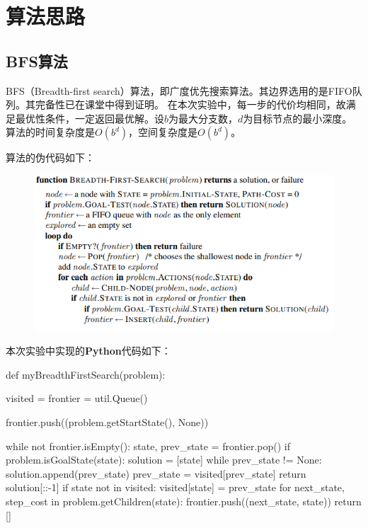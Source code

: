 \documentclass{ctexart}
\begin{document}
\section{\hei 算法思路}
\subsection{\hei BFS算法}
BFS（Breadth-first search）算法，即广度优先搜索算法。其边界选用的是FIFO队列。其完备性已在课堂中得到证明。
在本次实验中，每一步的代价均相同，故满足最优性条件，一定返回最优解。设$b$为最大分支数，$d$为目标节点的最小深度。
算法的时间复杂度是$O\left(b^{d}\right)$，空间复杂度是$O\left(b^{d}\right)$。
\par 算法的伪代码如下：
\begin{figure}[htbp]	
	\centering	
	\includegraphics[scale=0.5]{BFS_w.png}
		
\end{figure}
\par 本次实验中实现的\textbf{Python}代码如下：
\begin{python}
def myBreadthFirstSearch(problem):

    visited = {}
    frontier = util.Queue()

    frontier.push((problem.getStartState(), None))

    while not frontier.isEmpty():
        state, prev_state = frontier.pop()
        if problem.isGoalState(state):
            solution = [state]
            while prev_state != None:
                solution.append(prev_state)
                prev_state = visited[prev_state]
            return solution[::-1]
        if state not in visited:
            visited[state] = prev_state
            for next_state, step_cost in problem.getChildren(state):
                frontier.push((next_state, state))
    return []
	\end{python}
\end{document}
